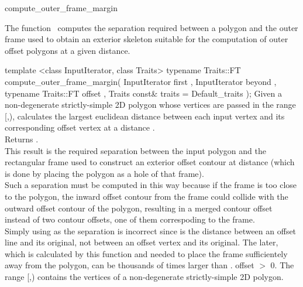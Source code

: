 

\begin{ccRefFunction}{compute_outer_frame_margin}


\ccDefinition

The function \ccRefName\ computes the separation required between a polygon and the outer frame used to obtain an exterior skeleton suitable for the computation of outer offset polygons at a given distance.


\ccFunction
{template <class InputIterator, class Traits>
typename Traits::FT
compute_outer_frame_margin( InputIterator       first
                          , InputIterator       beyond
                          , typename Traits::FT offset
                          , Traits const&       traits = Default_traits
                          );
} 
{Given a non-degenerate strictly-simple 2D polygon whose vertices are passed 
in the range [,), calculates the largest euclidean distance
 between each input vertex and its corresponding offset vertex at
a distance .\\
Returns .\\
This result is the required separation between the input polygon
and the rectangular frame used to construct an exterior offset contour
at distance  (which is done by placing the polygon as a hole of that frame).\\
Such a separation must be computed in this way because if the frame is 
too close to the polygon, the inward offset contour from the frame could
collide with the outward offset contour of the polygon, resulting in a merged
contour offset instead of two contour offsets, one of them correspoding to the frame.\\
Simply using  as the separation is incorrect since  is the distance 
between an offset line and its original, not between an offset vertex and its original.
The later, which is calculated by this function and needed to place the frame sufficientely
away from the polygon, can be thousands of times larger than .
\ccPrecond offset $>$ 0.
\ccPrecond The range [,) contains the vertices
of a non-degenerate strictly-simple 2D polygon.
}


\end{ccRefFunction}

